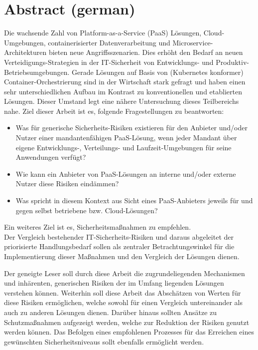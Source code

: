 \chapter*{Abstract (german)}
\thispagestyle{empty}
Die wachsende Zahl von Platform-as-a-Service (PaaS) Lösungen, Cloud-Umgebungen, containerisierter Datenverarbeitung und Microservice-Architekturen bieten neue Angriffsszenarien.
Dies erhöht den Bedarf an neuen Verteidigungs-Strategien in der IT-Sicherheit von Entwicklungs- und Produktiv-Betriebsumgebungen.
Gerade Lösungen auf Basis von (Kubernetes konformer) Container-Orchestrierung sind in der Wirtschaft stark gefragt und haben einen sehr unterschiedlichen Aufbau im Kontrast zu konventionellen und etablierten Lösungen.
Dieser Umstand legt eine nähere Untersuchung dieses Teilbereichs nahe.
Ziel dieser Arbeit ist es, folgende Fragestellungen zu beantworten:

\begin{itemize}

\item Was für generische Sicherheits-Risiken existieren für den Anbieter und/oder Nutzer einer mandantenfähigen PaaS-Lösung, wenn jeder Mandant über eigene Entwicklungs-, Verteilungs- und Laufzeit-Umgebungen für seine Anwendungen verfügt?

\item Wie kann ein Anbieter von PaaS-Lösungen an interne und/oder externe Nutzer diese Risiken eindämmen?

\item Was spricht in diesem Kontext aus Sicht eines PaaS-Anbieters jeweils für und gegen selbst betriebene bzw. Cloud-Lösungen?

\end{itemize}

Ein weiteres Ziel ist es, Sicherheitsmaßnahmen zu empfehlen. \\
Der Vergleich bestehender IT-Sicherheits-Risiken und daraus abgeleitet der priorisierte Handlungsbedarf sollen als zentraler Betrachtungswinkel für die Implementierung dieser Maßnahmen und den Vergleich der Lösungen dienen. 

Der geneigte Leser soll durch diese Arbeit die zugrundeliegenden Mechanismen und inhärenten, generischen Risiken der im Umfang liegenden Lösungen verstehen können.
Weiterhin soll diese Arbeit das Abschätzen von Werten für diese Risiken ermöglichen, welche sowohl für einen Vergleich untereinander als auch zu anderen Lösungen dienen. Darüber hinaus sollten Ansätze zu Schutzmaßnahmen aufgezeigt werden, welche zur Reduktion der Risiken genutzt werden können. Das Befolgen eines empfohlenen Prozesses für das Erreichen eines gewünschten Sicherheitsniveaus sollt ebenfalls ermöglicht werden.



